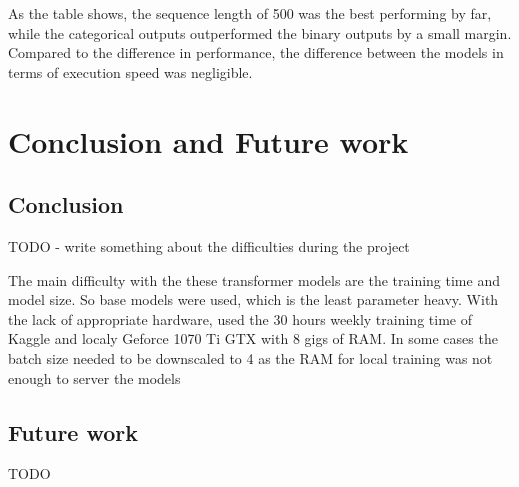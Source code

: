 \documentclass[runningheads]{llncs}
\begin{document}
As the table shows, the sequence length of 500 was the best performing by far, while the categorical outputs outperformed the binary outputs by a small margin. Compared to the difference in performance, the difference between the models in terms of execution speed was negligible.

\section{Conclusion and Future work}

\subsection{Conclusion}

TODO - write something about the difficulties during the project

The main difficulty with the these transformer models are the training time and model size. So base models were used, which is the least parameter heavy. With the lack of appropriate hardware, used the 30 hours weekly training time of Kaggle and localy Geforce 1070 Ti GTX with 8 gigs of RAM. In some cases the batch size needed to be downscaled to 4 as the RAM for local training was not enough to server the models

\subsection{Future work}

TODO



\end{document}
